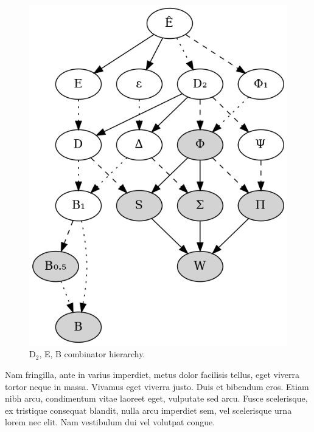 \documentclass[10pt]{article}
\begin{document}
\begin{figure}[!htb]
  \centerline{\includegraphics[scale = 0.5]{./combinator-d2-e-b-connected.png}}
  \caption{D$_2$, E, B combinator hierarchy.} %
\end{figure}

Nam fringilla, ante in varius imperdiet, metus dolor facilisis tellus, eget viverra tortor neque in massa. Vivamus eget viverra justo. Duis et bibendum eros. Etiam nibh arcu, condimentum vitae laoreet eget, vulputate sed arcu. Fusce scelerisque, ex tristique consequat blandit, nulla arcu imperdiet sem, vel scelerisque urna lorem nec elit. Nam vestibulum dui vel volutpat congue.
\end{document}
